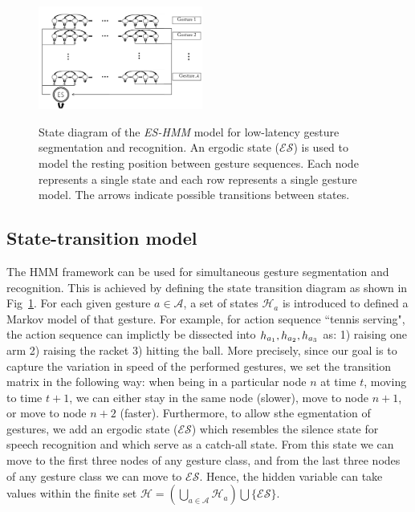 \begin{figure}[t]
  \centering
  \includegraphics[width=0.48\textwidth]{images/HMM_2_new}\\
  \caption{
    State diagram of the \emph{ES-HMM} model for low-latency gesture segmentation and recognition. An ergodic state (\emph{$\mathcal{ES}$}) is used to model the resting position between gesture sequences. Each node represents a single state and each row represents a single gesture model. The arrows indicate possible transitions between states.}
    \label{HMM_ES}
\end{figure}


\subsection{State-transition model}
\label{sec:ProblemFormation}


The HMM framework can be used for simultaneous gesture segmentation and recognition.
This is achieved by defining the state transition diagram as shown in Fig~\ref{HMM_ES}. For each given gesture $a \in \mathcal{A}$, a set of states $\mathcal{H}_a$ is introduced to defined a Markov model of that gesture. For example, for action sequence ``tennis serving", the action sequence can implictly be dissected into $h_{a_1}, h_{a_2}, h_{a_3}$ as: 1) raising one arm 2) raising the racket 3) hitting the ball.
More precisely, since our goal is to capture the variation in speed of the performed gestures, we set the transition matrix \transitionmatrix{}  in the following way: when being in a particular node $n$ at time $t$, moving to time $t + 1$, we can either stay in the same node (slower), move to node $n + 1$, or move to node $n+2$ (faster).
%
Furthermore, to allow sthe egmentation of gestures, we add an ergodic state 
(\emph{$\mathcal{ES}$}) which resembles the silence state for speech recognition and which serve as a catch-all state.
From this state we can move to the first three nodes of any gesture class, and from the last three nodes of any gesture class we can move to $\mathcal{ES}$.
Hence, the hidden variable \hiddenvariable{} can take values within the finite set
 $\mathcal{H}=(\bigcup _{a \in \mathcal{A}} \mathcal{H}_a) \bigcup \{\mathcal{ES}\}$.  

